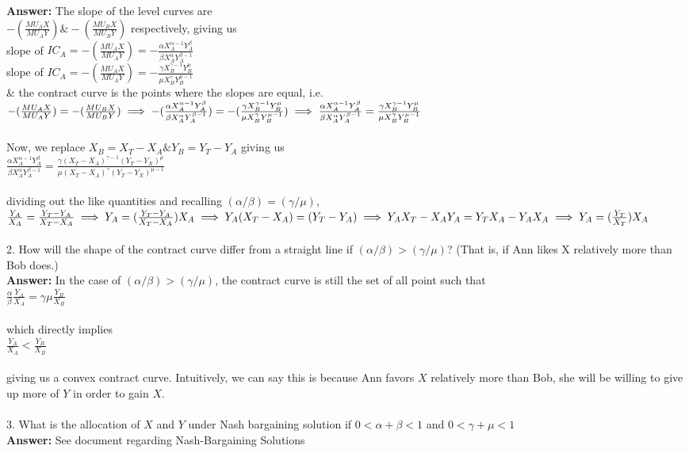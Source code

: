\documentclass[11pt]{article}
\begin{document}
\textbf{Answer: }The slope of the level curves are\\
$-(\frac{MU_AX}{MU_AY}) \& -(\frac{MU_BX}{MU_BY})$ respectively, giving us\\
slope of $IC_A = -(\frac{MU_AX}{MU_AY}) = -\frac{\alpha X^{\alpha - 1}_AY^\beta _A}{\beta X^{\alpha}_AY^{\beta - 1} _A}$\\
slope of $IC_A = -(\frac{MU_AX}{MU_AY}) = -\frac{\gamma X^{\gamma - 1}_BY^\mu _B}{\mu X^{\gamma}_BY^{\mu - 1} _B}$\\
\& the contract curve is the points where the slopes are equal, i.e.\\
$-(\frac{MU_AX}{MU_AY}) = -(\frac{MU_BX}{MU_BY})\\
\implies -(\frac{\alpha X^{\alpha - 1}_AY^\beta _A}{\beta X^{\alpha}_AY^{\beta - 1} _A}) = -(\frac{\gamma X^{\gamma - 1}_BY^\mu _B}{\mu X^{\gamma}_BY^{\mu - 1} _B})\\
\implies \frac{\alpha X^{\alpha - 1}_AY^\beta _A}{\beta X^{\alpha}_AY^{\beta - 1} _A} = \frac{\gamma X^{\gamma - 1}_BY^\mu _B}{\mu X^{\gamma}_BY^{\mu - 1} _B}$\\
\\
Now, we replace $X_B = X_T - X_A \& Y_B = Y_T - Y_A$ giving us\\
$\frac{\alpha X^{\alpha - 1}_AY^\beta _A}{\beta X^{\alpha}_AY^{\beta - 1} _A} = \frac{\gamma (X_T - X_A)^{\gamma - 1}(Y_T - Y_X)^\mu}{\mu (X_T - X_A)^{\gamma}(Y_T - Y_X)^{\mu - 1}}$\\
\\
dividing out the like quantities and recalling $(\alpha /\beta) = (\gamma /\mu)$,
$\frac{Y_A}{X_A} = \frac{Y_T - Y_A}{X_T - X_A}\\
\implies Y_A = (\frac{Y_T - Y_A}{X_T - X_A})X_A\\
\implies Y_A(X_T - X_A) = (Y_T - Y_A)\\
\implies Y_AX_T - X_AY_A = Y_TX_A - Y_AX_A\\
\implies Y_A = (\frac{Y_T}{X_T})X_A$\\
\\
2. How will the shape of the contract curve differ from a straight line if $(\alpha /\beta) > (\gamma /\mu)$? (That is, if Ann likes X relatively more than Bob does.)\\
\textbf{Answer: }In the case of $(\alpha /\beta) > (\gamma /\mu)$, the contract curve is still the set of all point such that\\
$\frac{\alpha}{\beta}\frac{Y_A}{X_A} = {\gamma}{\mu}\frac{Y_B}{X_B}$\\
\\
which directly implies\\
$\frac{Y_A}{X_A} < \frac{Y_B}{X_B}$\\
\\
giving us a convex contract curve. Intuitively, we can say this is because Ann favors $X$ relatively more than Bob, she will be willing to give up more of $Y$ in order to gain $X$.\\
\\
3. What is the allocation of $X$ and $Y$ under Nash bargaining solution if $0 < \alpha + \beta < 1$ and $0 < \gamma + \mu < 1$\\
\textbf{Answer: }See document regarding Nash-Bargaining Solutions
\end{document}
